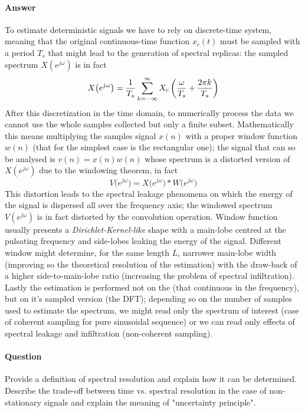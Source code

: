 	\paragraph{Answer} To estimate deterministic signals we have to rely on discrete-time system, meaning that the original continuous-time function $x_c(t)$ must be sampled with a period $T_s$ that might lead to the generation of spectral replicas: the sampled spectrum $X(e^{j\omega})$ is in fact
	\[ X \big(e^{j\omega}\big) = \frac 1{T_s} \sum_{k=-\infty}^\infty X_c\left( \frac{\omega}{T_s} + \frac{2\pi k}{T_s} \right) \]
	After this discretization in the time domain, to numerically process the data we cannot use the whole samples collected but only a finite subset. Mathematically this means multiplying the samples signal $x(n)$ with a proper window function $w(n)$ (that for the simplest case is the rectangular one); the signal that can so be analysed is $v(n) = x(n)w(n)$ whose spectrum is a distorted version of $X(e^{j\omega})$ due to the windowing theorem, in fact
	\[ V\big(e^{j\omega}\big) = X\big(e^{j\omega}\big)*W\big(e^{j\omega}\big) \]
	This distortion leads to the spectral leakage phenomena on which the energy of the signal is dispersed all over the frequency axis; the windowed spectrum $V(e^{j\omega})$ is in fact distorted by the convolution operation. Window function usually presents a \textit{Dirichlet-Kernel-like} shape with a main-lobe centred at the pulsating frequency and side-lobes leaking the energy of the signal. Different window might determine, for the same length $L$, narrower main-lobe width (improving so the theoretical resolution of the estimation) with the draw-back of a higher side-to-main-lobe ratio (increasing the problem of spectral infiltration).\\
	Lastly the estimation is performed not on the \dtft (that continuous in the frequency), but on it's sampled version (the DFT); depending so on the number of samples used to estimate the spectrum, we might read only the spectrum of interest (case of coherent sampling for pure sinusoidal sequence) or we can read only effects of spectral leakage and infiltration (non-coherent sampling).
	
\newquestion
	\paragraph{Question} Provide a definition of spectral resolution and explain how it can be determined. Describe the trade-off 	between time vs. spectral resolution in the case of non-stationary signals and explain the meaning of "uncertainty principle".
	
